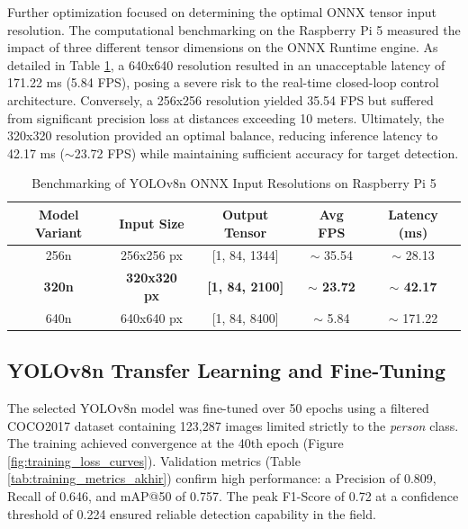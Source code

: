 \documentclass[conference]{IEEEtran}
\begin{document}
Further optimization focused on determining the optimal ONNX tensor input resolution. The computational benchmarking on the Raspberry Pi 5 measured the impact of three different tensor dimensions on the ONNX Runtime engine. As detailed in Table \ref{tab:model_comparison}, a 640x640 resolution resulted in an unacceptable latency of 171.22 ms (5.84 FPS), posing a severe risk to the real-time closed-loop control architecture. Conversely, a 256x256 resolution yielded 35.54 FPS but suffered from significant precision loss at distances exceeding 10 meters. Ultimately, the 320x320 resolution provided an optimal balance, reducing inference latency to 42.17 ms ($\sim$23.72 FPS) while maintaining sufficient accuracy for target detection.

\begin{table}[ht]
    \centering
    \caption{Benchmarking of YOLOv8n ONNX Input Resolutions on Raspberry Pi 5}
    \label{tab:model_comparison}
    \setlength{\tabcolsep}{4pt}
    \begin{tabular}{@{}ccccc@{}}
        \toprule
        \textbf{Model Variant} & \textbf{Input Size} & \textbf{Output Tensor} & \textbf{Avg FPS} & \textbf{Latency (ms)} \\
        \midrule
        256n & 256x256 px & [1, 84, 1344] & $\sim$ 35.54 & $\sim$ 28.13 \\
        \textbf{320n} & \textbf{320x320 px} & \textbf{[1, 84, 2100]} & \textbf{$\sim$ 23.72} & \textbf{$\sim$ 42.17} \\
        640n & 640x640 px & [1, 84, 8400] & $\sim$ 5.84  & $\sim$ 171.22 \\
        \bottomrule
    \end{tabular}
\end{table}

\subsection{YOLOv8n Transfer Learning and Fine-Tuning}
The selected YOLOv8n model was fine-tuned over 50 epochs using a filtered COCO2017 dataset containing 123,287 images limited strictly to the \textit{person} class. The training achieved convergence at the 40th epoch (Figure \ref{fig:training_loss_curves}). Validation metrics (Table \ref{tab:training_metrics_akhir}) confirm high performance: a Precision of 0.809, Recall of 0.646, and mAP@50 of 0.757. The peak F1-Score of 0.72 at a confidence threshold of 0.224 ensured reliable detection capability in the field.
\end{document}
